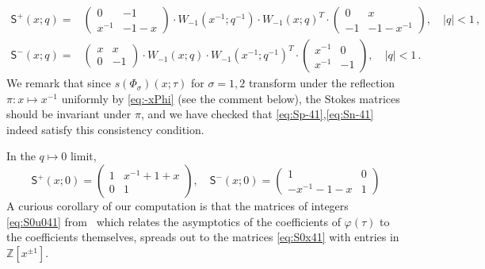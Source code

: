\documentclass[12pt,reqno]{amsart}
\theoremstyle{definition}
\def\IZ{\mathbb{Z}}
\def\s{\sigma}
\def\-{\,-\,}
\def\ms{\mathsf}
\def\IZ{\mathbb{Z}}
\begin{document}
\begin{subequations}
\begin{align}
    \ms{S}^+(x;q) =
    &\begin{pmatrix}
      0&-1\\
      x^{-1}&-1-x
    \end{pmatrix}
              \cdot W_{-1}(x^{-1};q^{-1})\cdot W_{-1}(x;q)^T\cdot
              \begin{pmatrix}
                0&x\\
                -1&-1-x^{-1}
              \end{pmatrix} ,\quad |q|<1\,,
  \label{eq:Sp-41}\\
    \ms{S}^-(x;q)=
    &\begin{pmatrix}
      x&x\\
      0&-1
    \end{pmatrix}
              \cdot W_{-1}(x;q)\cdot W_{-1}(x^{-1};q^{-1})^T\cdot
              \begin{pmatrix}
                x^{-1}&0\\
                x^{-1}&-1
              \end{pmatrix},\quad |q|<1\,.
                                \label{eq:Sn-41}
\end{align}
\end{subequations}
We remark that since $s(\Phi_\s)(x;\tau)$ for $\s=1,2$ transform under
the reflection $\pi: x\mapsto x^{-1}$ uniformly by \eqref{eq:-xPhi} (see
the comment below), the Stokes matrices should be invariant under
$\pi$, and we have checked that \eqref{eq:Sp-41},\eqref{eq:Sn-41}
indeed satisfy this consistency condition.

In the $q\mapsto 0$ limit,
\begin{equation}
  \ms{S}^+(x;0) =
  \begin{pmatrix}
    1&x^{-1}+1+x\\0&1
  \end{pmatrix},\quad
  \ms{S}^-(x;0) =
  \begin{pmatrix}
    1&0\\-x^{-1}-1-x&1
  \end{pmatrix}
  \label{eq:S0x41}
\end{equation}
A curious corollary of our computation is that the matrices of
integers \eqref{eq:S0u041} from~\cite{gh-res,GZ:kashaev} which relates
the asymptotics of the coefficients of $\varphi(\tau)$ to the
coefficients themselves, spreads out to the matrices \eqref{eq:S0x41}
with entries in $\IZ[x^{\pm 1}]$.
\end{document}

